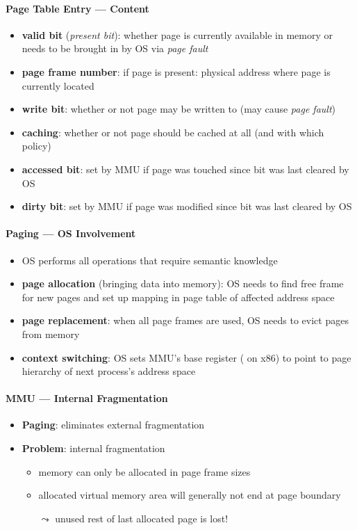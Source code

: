 \paragraph{Page Table Entry --- Content}
\begin{itemize}
  \item \textbf{valid bit} (\emph{present bit}): whether page is currently available in memory or needs to be brought in by OS via \emph{page fault}
  \item \textbf{page frame number}: if page is present: physical address where page is currently located
  \item \textbf{write bit}: whether or not page may be written to (may cause \emph{page fault})
  \item \textbf{caching}: whether or not page should be cached at all (and with which policy)
  \item \textbf{accessed bit}: set by MMU if page was touched since bit was last cleared by OS
  \item \textbf{dirty bit}: set by MMU if page was modified since bit was last cleared by OS
\end{itemize}

\paragraph{Paging --- OS Involvement}
\begin{itemize}
  \item OS performs all operations that require semantic knowledge
  \item \textbf{page allocation} (bringing data into memory): OS needs to find free frame for new pages and set up mapping in page table of affected address space
  \item \textbf{page replacement}: when all page frames are used, OS needs to evict pages from memory
  \item \textbf{context switching}: OS sets MMU's base register ( on x86) to point to page hierarchy of next process's address space
\end{itemize}

\paragraph{MMU --- Internal Fragmentation}
\begin{itemize}
  \item \textbf{Paging}: eliminates external fragmentation
  \item \textbf{Problem}: internal fragmentation
  \begin{itemize}
    \item memory can only be allocated in page frame sizes
    \item allocated virtual memory area will generally not end at page boundary
    \item[$ \leadsto $] unused rest of last allocated page is lost!
  \end{itemize}
\end{itemize}

